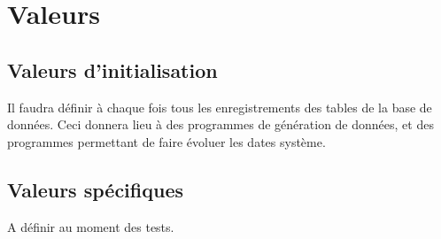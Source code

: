 	\section{Valeurs}
	\subsection{Valeurs d'initialisation}
	Il faudra définir à chaque fois tous les enregistrements des tables de la
	base de données. 
	Ceci donnera lieu à des programmes de génération de données, et des 
	programmes permettant de faire évoluer les dates système.
	\subsection{Valeurs spécifiques}
	A définir au moment des tests.

